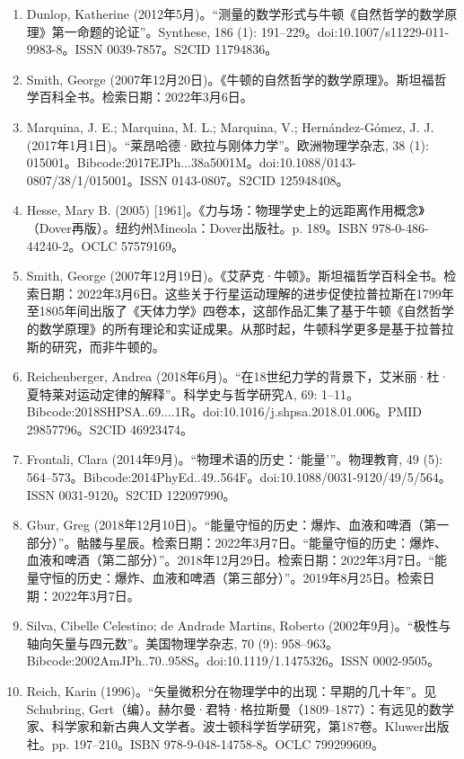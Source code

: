 \begin{enumerate}
\item Dunlop, Katherine (2012年5月)。“测量的数学形式与牛顿《自然哲学的数学原理》第一命题的论证”。Synthese, 186 (1): 191–229。doi:10.1007/s11229-011-9983-8。ISSN 0039-7857。S2CID 11794836。
\item Smith, George (2007年12月20日)。《牛顿的自然哲学的数学原理》。斯坦福哲学百科全书。检索日期：2022年3月6日。
\item Marquina, J. E.; Marquina, M. L.; Marquina, V.; Hernández-Gómez, J. J. (2017年1月1日)。“莱昂哈德·欧拉与刚体力学”。欧洲物理学杂志, 38 (1): 015001。Bibcode:2017EJPh...38a5001M。doi:10.1088/0143-0807/38/1/015001。ISSN 0143-0807。S2CID 125948408。
\item Hesse, Mary B. (2005) [1961]。《力与场：物理学史上的远距离作用概念》（Dover再版）。纽约州Mineola：Dover出版社。p. 189。ISBN 978-0-486-44240-2。OCLC 57579169。
\item Smith, George (2007年12月19日)。《艾萨克·牛顿》。斯坦福哲学百科全书。检索日期：2022年3月6日。这些关于行星运动理解的进步促使拉普拉斯在1799年至1805年间出版了《天体力学》四卷本，这部作品汇集了基于牛顿《自然哲学的数学原理》的所有理论和实证成果。从那时起，牛顿科学更多是基于拉普拉斯的研究，而非牛顿的。
\item Reichenberger, Andrea (2018年6月)。“在18世纪力学的背景下，艾米丽·杜·夏特莱对运动定律的解释”。科学史与哲学研究A, 69: 1–11。Bibcode:2018SHPSA..69....1R。doi:10.1016/j.shpsa.2018.01.006。PMID 29857796。S2CID 46923474。
\item Frontali, Clara (2014年9月)。“物理术语的历史：‘能量’”。物理教育, 49 (5): 564–573。Bibcode:2014PhyEd..49..564F。doi:10.1088/0031-9120/49/5/564。ISSN 0031-9120。S2CID 122097990。
\item Gbur, Greg (2018年12月10日)。“能量守恒的历史：爆炸、血液和啤酒（第一部分）”。骷髅与星辰。检索日期：2022年3月7日。“能量守恒的历史：爆炸、血液和啤酒（第二部分）”。2018年12月29日。检索日期：2022年3月7日。“能量守恒的历史：爆炸、血液和啤酒（第三部分）”。2019年8月25日。检索日期：2022年3月7日。
\item Silva, Cibelle Celestino; de Andrade Martins, Roberto (2002年9月)。“极性与轴向矢量与四元数”。美国物理学杂志, 70 (9): 958–963。Bibcode:2002AmJPh..70..958S。doi:10.1119/1.1475326。ISSN 0002-9505。
\item Reich, Karin (1996)。“矢量微积分在物理学中的出现：早期的几十年”。见Schubring, Gert（编）。赫尔曼·君特·格拉斯曼（1809–1877）：有远见的数学家、科学家和新古典人文学者。波士顿科学哲学研究，第187卷。Kluwer出版社。pp. 197–210。ISBN 978-9-048-14758-8。OCLC 799299609。
\end{enumerate}